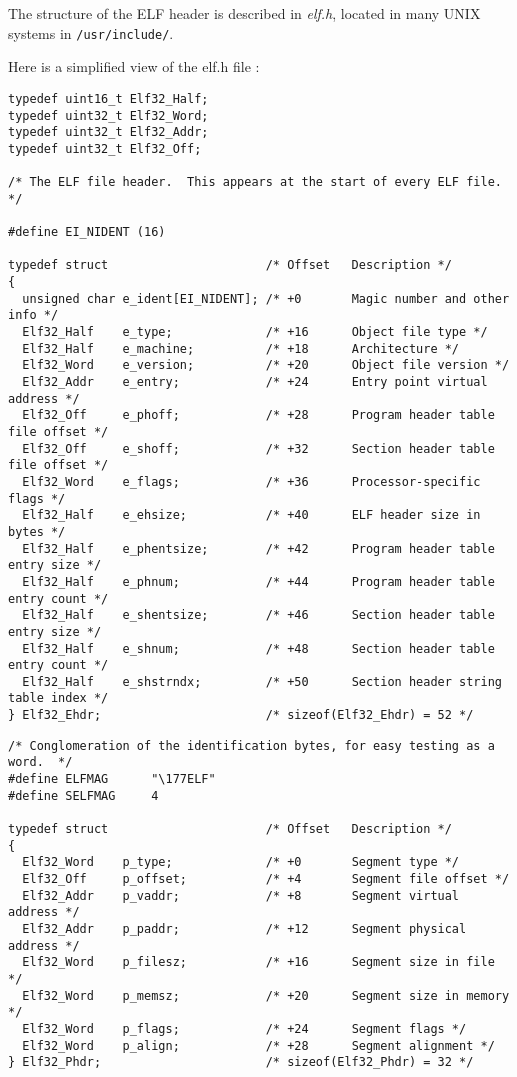 The structure of the ELF header is described in \emph{elf.h}, located in many
UNIX systems in \verb+/usr/include/+.

Here is a simplified view of the elf.h file :

\begin{verbatim}
typedef uint16_t Elf32_Half;
typedef uint32_t Elf32_Word;
typedef uint32_t Elf32_Addr;
typedef uint32_t Elf32_Off;

/* The ELF file header.  This appears at the start of every ELF file.  */

#define EI_NIDENT (16)

typedef struct                      /* Offset   Description */
{
  unsigned char e_ident[EI_NIDENT]; /* +0       Magic number and other info */
  Elf32_Half    e_type;             /* +16      Object file type */
  Elf32_Half    e_machine;          /* +18      Architecture */
  Elf32_Word    e_version;          /* +20      Object file version */
  Elf32_Addr    e_entry;            /* +24      Entry point virtual address */
  Elf32_Off     e_phoff;            /* +28      Program header table file offset */
  Elf32_Off     e_shoff;            /* +32      Section header table file offset */
  Elf32_Word    e_flags;            /* +36      Processor-specific flags */
  Elf32_Half    e_ehsize;           /* +40      ELF header size in bytes */
  Elf32_Half    e_phentsize;        /* +42      Program header table entry size */
  Elf32_Half    e_phnum;            /* +44      Program header table entry count */
  Elf32_Half    e_shentsize;        /* +46      Section header table entry size */
  Elf32_Half    e_shnum;            /* +48      Section header table entry count */
  Elf32_Half    e_shstrndx;         /* +50      Section header string table index */
} Elf32_Ehdr;                       /* sizeof(Elf32_Ehdr) = 52 */
\end{verbatim}
\newpage
\begin{verbatim}
/* Conglomeration of the identification bytes, for easy testing as a word.  */
#define	ELFMAG		"\177ELF"
#define	SELFMAG		4

typedef struct                      /* Offset   Description */
{
  Elf32_Word    p_type;             /* +0       Segment type */
  Elf32_Off     p_offset;           /* +4       Segment file offset */
  Elf32_Addr    p_vaddr;            /* +8       Segment virtual address */
  Elf32_Addr    p_paddr;            /* +12      Segment physical address */
  Elf32_Word    p_filesz;           /* +16      Segment size in file */
  Elf32_Word    p_memsz;            /* +20      Segment size in memory */
  Elf32_Word    p_flags;            /* +24      Segment flags */
  Elf32_Word    p_align;            /* +28      Segment alignment */
} Elf32_Phdr;                       /* sizeof(Elf32_Phdr) = 32 */
\end{verbatim}

